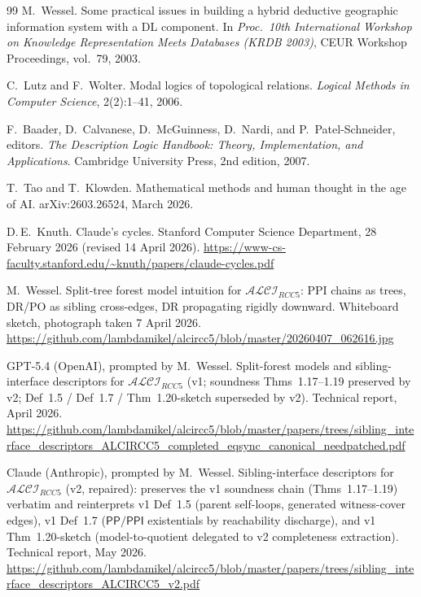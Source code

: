 \documentclass[
]{ceurart}
\theoremstyle{definition}
\newcommand{\ALCIRCC}[1]{\ensuremath{\mathcal{ALCI}_{\mathit{RCC#1}}}}
\newcommand{\PP}{\ensuremath{\mathsf{PP}}}
\newcommand{\PPI}{\ensuremath{\mathsf{PPI}}}
\begin{document}
\begin{thebibliography}{99}
 M.\ Wessel.  \newblock Some practical issues
  in building a hybrid deductive geographic information system with a
  {DL} component.  \newblock In \emph{Proc.\ 10th International
  Workshop on Knowledge Representation Meets Databases (KRDB 2003)},
  CEUR Workshop Proceedings, vol.~79, 2003.

C.\ Lutz and F.\ Wolter.
\newblock Modal logics of topological relations.
\newblock \emph{Logical Methods in Computer Science}, 2(2):1--41, 2006.

 F.\ Baader, D.\ Calvanese, D.\ McGuinness,
  D.\ Nardi, and P.\ Patel-Schneider, editors.  \newblock \emph{The
  Description Logic Handbook: Theory, Implementation, and
  Applications}.  \newblock Cambridge University Press, 2nd edition,
  2007.

 T.\ Tao and T.\ Klowden.  \newblock
  Mathematical methods and human thought in the age of {AI}.
  \newblock arXiv:2603.26524, March 2026.

 D.\,E.\ Knuth.  \newblock Claude's
  cycles.  \newblock Stanford Computer Science Department, 28 February
  2026 (revised 14 April 2026).  \newblock
  \url{https://www-cs-faculty.stanford.edu/~knuth/papers/claude-cycles.pdf}

 M.\ Wessel.  \newblock Split-tree
  forest model intuition for $\mathcal{ALCI}_{RCC5}$: {PPI} chains as
  trees, {DR/PO} as sibling cross-edges, {DR} propagating rigidly
  downward.  \newblock Whiteboard sketch, photograph taken 7 April
  2026.  \newblock
  \url{https://github.com/lambdamikel/alcircc5/blob/master/20260407_062616.jpg}


GPT-5.4 (OpenAI), prompted by M.\ Wessel.
\newblock Split-forest models and sibling-interface descriptors for
  $\ALCIRCC{5}$ (v1; soundness Thms~1.17--1.19 preserved by v2;
  Def~1.5 / Def~1.7 / Thm~1.20-sketch superseded by v2).
\newblock Technical report, April 2026.
\newblock \url{https://github.com/lambdamikel/alcircc5/blob/master/papers/trees/sibling_interface_descriptors_ALCIRCC5_completed_eqsync_canonical_needpatched.pdf}

Claude (Anthropic), prompted by M.\ Wessel.
\newblock Sibling-interface descriptors for $\ALCIRCC{5}$ (v2,
  repaired): preserves the v1 soundness chain
  (Thms~1.17--1.19) verbatim and reinterprets v1 Def~1.5
  (parent self-loops, generated witness-cover edges), v1 Def~1.7
  ($\PP/\PPI$ existentials by reachability discharge), and v1
  Thm~1.20-sketch (model-to-quotient delegated to v2 completeness
  extraction).
\newblock Technical report, May 2026.
\newblock \url{https://github.com/lambdamikel/alcircc5/blob/master/papers/trees/sibling_interface_descriptors_ALCIRCC5_v2.pdf}


\end{thebibliography}
\end{document}
